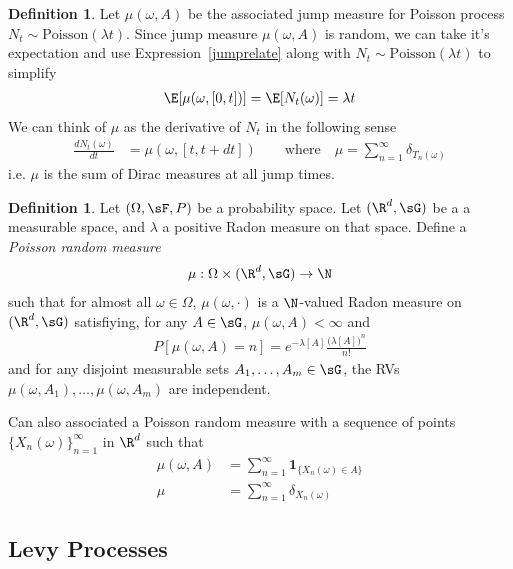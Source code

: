 \documentclass[12pt]{article}
\theoremstyle{plain}
\theoremstyle{definition}
\newtheorem{defn}[thm]{Definition}
\theoremstyle{remark}
\newcommand{\ra}{\rightarrow}
\newcommand{\sumninf}{\sum^\infty_{n=1}}
\newcommand{\ninf}{_{n=1}^\infty}
\begin{document}
\begin{defn}
Let $\mu(\omega,A)$ be the associated jump measure for Poisson process
$N_t\sim\text{Poisson}(\lambda t)$.
Since jump measure $\mu(\omega,A)$ is random, we can take it's
expectation and use Expression~\ref{jumprelate} along with
$N_t\sim\text{Poisson}(\lambda t)$
to simplify
\begin{align*}
  \E[\mu(\omega,[0,t])]
  =
  \E[N_t(\omega)]
  =
  \lambda t
\end{align*}
We can think of $\mu$ as the derivative of $N_t$ in the following sense
\begin{align*}
  \frac{dN_t(\omega)}{dt}
  &=
  \mu(\omega,[t,t+dt])
  \qquad\text{where}\quad
  \mu
  = \sum_{n=1}^\infty \delta_{T_n(\omega)}
\end{align*}
i.e. $\mu$ is the sum of Dirac measures at all jump times.
\end{defn}

\begin{defn}
Let $(\Omega,\sF,P)$ be a probability space.
Let $(\R^d,\sG)$ be a a measurable space, and $\lambda$ a positive Radon
measure on that space.
Define a \emph{Poisson random measure}
\begin{align*}
  \mu:\Omega\times(\R^d,\sG)\ra \N
\end{align*}
such that for almost all $\omega\in\Omega$,
$\mu(\omega,\cdot)$ is a $\N$-valued Radon measure on $(\R^d,\sG)$
satisfiying, for any $A\in\sG$,
$\mu(\omega,A)<\infty$ and
\begin{align*}
  P[\mu(\omega,A)=n]
  =
  e^{-\lambda[A]}
  \frac{\big(\lambda[A]\big)^n}{n!}
\end{align*}
and for any disjoint measurable sets $A_1,\ldots,A_m\in\sG$, the RVs
$\mu(\omega,A_1),\ldots,\mu(\omega,A_m)$ are independent.

Can also associated a Poisson random measure with a sequence of points
$\{X_n(\omega)\}\ninf$ in $\R^d$ such that
\begin{align*}
  \mu(\omega,A)
  &=
  \sumninf \mathbf{1}_{\{X_n(\omega)\in A\}}
  \\
  \mu
  &=
  \sumninf \delta_{X_n(\omega)}
\end{align*}
\end{defn}

\clearpage
\subsection{Levy Processes}
\end{document}
